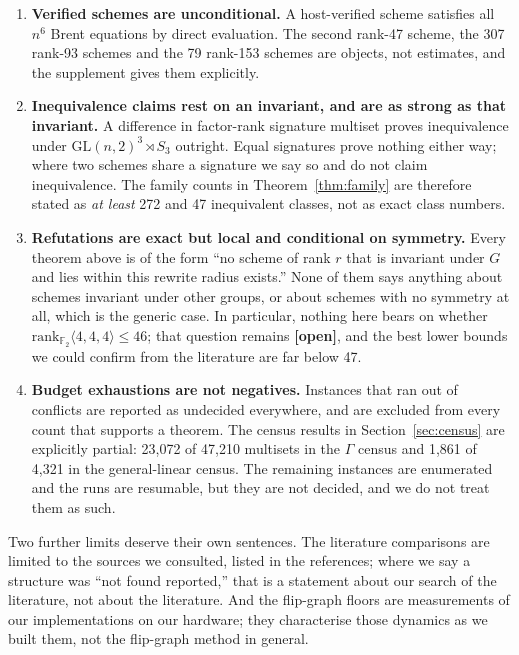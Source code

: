 \documentclass[11pt]{article}
\newcommand{\FF}{\mathbb{F}_2}
\newcommand{\tw}[3]{\langle #1,#2,#3\rangle}
\newcommand{\GL}{\mathrm{GL}}
\begin{document}
\begin{enumerate}
\item \textbf{Verified schemes are unconditional.} A host-verified scheme satisfies all $n^6$ Brent
equations by direct evaluation. The second rank-47 scheme, the 307 rank-93 schemes and the 79 rank-153
schemes are objects, not estimates, and the supplement gives them explicitly.

\item \textbf{Inequivalence claims rest on an invariant, and are as strong as that invariant.} A
difference in factor-rank signature multiset proves inequivalence under $\GL(n,2)^3\rtimes S_3$
outright. Equal signatures prove nothing either way; where two schemes share a signature we say so and do
not claim inequivalence. The family counts in Theorem~\ref{thm:family} are therefore stated as
\emph{at least} 272 and 47 inequivalent classes, not as exact class numbers.

\item \textbf{Refutations are exact but local and conditional on symmetry.} Every theorem above is of the
form ``no scheme of rank $r$ that is invariant under $G$ and lies within this rewrite radius exists.''
None of them says anything about schemes invariant under other groups, or about schemes with no symmetry
at all, which is the generic case. In particular, nothing here bears on whether
$\mathrm{rank}_{\FF}\tw444 \leq 46$; that question remains \textbf{[open]}, and the best lower bounds we
could confirm from the literature are far below 47.

\item \textbf{Budget exhaustions are not negatives.} Instances that ran out of conflicts are reported as
undecided everywhere, and are excluded from every count that supports a theorem. The census results in
Section~\ref{sec:census} are explicitly partial: 23{,}072 of 47{,}210 multisets in the $\Gamma$ census and
1{,}861 of 4{,}321 in the general-linear census. The remaining instances are enumerated and the runs are
resumable, but they are not decided, and we do not treat them as such.
\end{enumerate}

Two further limits deserve their own sentences. The literature comparisons are limited to the sources we
consulted, listed in the references; where we say a structure was ``not found reported,'' that is a
statement about our search of the literature, not about the literature. And the flip-graph floors are
measurements of our implementations on our hardware; they characterise those dynamics as we built them,
not the flip-graph method in general.
\end{document}
